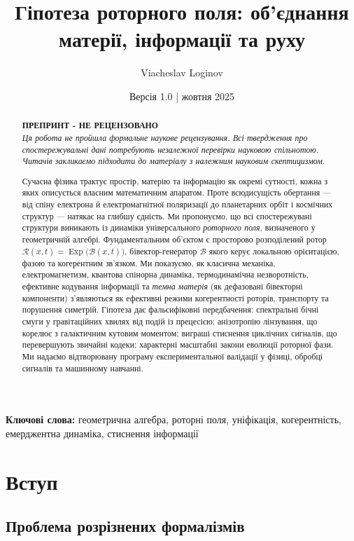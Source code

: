 \documentclass[11pt,a4paper]{article}
\title{\textbf{Гіпотеза роторного поля: об'єднання матерії, інформації та руху}}
\author[1]{Viacheslav Loginov}
\affil[1]{Київ, Україна\\ \texttt{barthez.slavik@gmail.com}}
\date{\small Версія 1.0 \quad|\quad 10 жовтня 2025}
\newcommand{\Exp}{\operatorname{Exp}}
\newcommand{\Rotor}{\mathcal{R}}
\newcommand{\Biv}{\mathcal{B}}
\theoremstyle{definition}
\theoremstyle{plain}
\theoremstyle{remark}
\begin{document}
\maketitle

\begin{abstract}
\noindent
\textbf{ПРЕПРИНТ - НЕ РЕЦЕНЗОВАНО}\\
\textit{Ця робота не пройшла формальне наукове рецензування. Всі твердження про спостережувальні дані потребують незалежної перевірки науковою спільнотою. Читачів закликаємо підходити до матеріалу з належним науковим скептицизмом.}

\medskip
\noindent\noindent
Сучасна фізика трактує простір, матерію та інформацію як окремі сутності, кожна з яких описується власним математичним апаратом. Проте всюдисущість обертання — від спіну електрона й електромагнітної поляризації до планетарних орбіт і космічних структур — натякає на глибшу єдність. Ми пропонуємо, що всі спостережувані структури виникають із динаміки універсального \emph{роторного поля}, визначеного у геометричній алгебрі. Фундаментальним об'єктом є просторово розподілений ротор $\Rotor(x,t)=\Exp\!\big(\Biv(x,t)\big)$, бівектор-генератор $\Biv$ якого керує локальною орієнтацією, фазою та когерентним зв'язком. Ми показуємо, як класична механіка, електромагнетизм, квантова спінорна динаміка, термодинамічна незворотність, ефективне кодування інформації та \emph{темна матерія} (як дефазовані бівекторні компоненти) з'являються як ефективні режими когерентності роторів, транспорту та порушення симетрій. Гіпотеза дає фальсифіковні передбачення: спектральні бічні смуги у гравітаційних хвилях від подій із прецесією; анізотропію лінзування, що корелює з галактичним кутовим моментом; виграші стиснення циклічних сигналів, що перевершують звичайні кодеки; характерні масштабні закони еволюції роторної фази. Ми надаємо відтворювану програму експериментальної валідації у фізиці, обробці сигналів та машинному навчанні.
\end{abstract}

\noindent\textbf{Ключові слова:} геометрична алгебра, роторні поля, уніфікація, когерентність, емерджентна динаміка, стиснення інформації

\vspace{1em}

\section{Вступ}

\subsection{Проблема розрізнених формалізмів}
\end{document}

